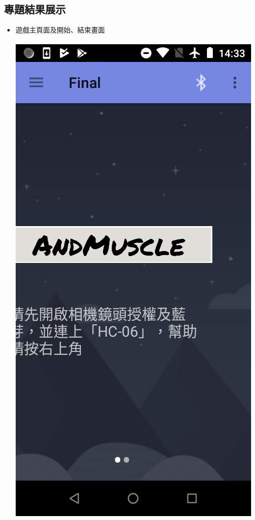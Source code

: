 \documentclass[12pt]{article}  %
\theoremstyle{plain}
\begin{document}
\subsection{專題結果展示}
\begin{itemize}
\item 遊戲主頁面及開始、結束畫面 \\ \\
\includegraphics[scale=0.2]{pic/ch4/game01.png} 

\end{itemize}
\end{document}
